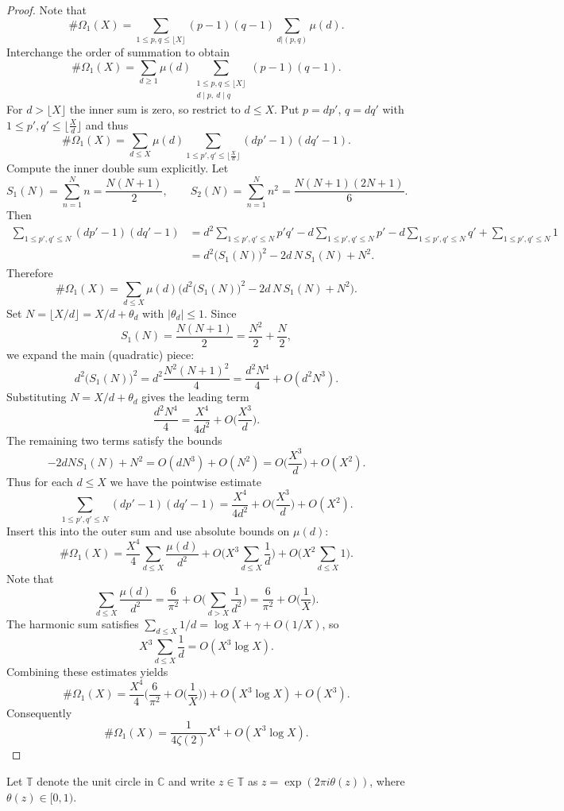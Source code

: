 \documentclass[table]{amsart}
\newcommand{\op}[1]{\operatorname{#1}}
\numberwithin{equation}{section}
\begin{document}
\begin{proof}
    Note that 
    \[\# \Omega_1(X)=\sum_{1\leq p, q\leq \lfloor X\rfloor } (p-1)(q-1)\sum_{d|(p,q)} \mu(d).\]
\noindent Interchange the order of summation to obtain
\[
\#\Omega_1(X)=\sum_{d\ge1}\mu(d)\sum_{\substack{1\le p,q\le\lfloor X\rfloor\\ d\mid p,\ d\mid q}} (p-1)(q-1).
\]
For \(d>\lfloor X\rfloor\) the inner sum is zero, so restrict to \(d\le X\). Put \(p=dp'\), \(q=dq'\) with \(1\le p',q'\le \lfloor\frac{X}{d}\rfloor\) and thus
\[
\#\Omega_1(X)=\sum_{d\le X}\mu(d)\sum_{1\le p',q'\le \lfloor\frac{X}{d}\rfloor} (dp'-1)(dq'-1).
\]
Compute the inner double sum explicitly. Let
\[
S_1(N)=\sum_{n=1}^N n=\frac{N(N+1)}{2},\qquad
S_2(N)=\sum_{n=1}^N n^2=\frac{N(N+1)(2N+1)}{6}.
\]
Then
\begin{align*}
\sum_{1\le p',q'\le N} (dp'-1)(dq'-1)
&= d^2\sum_{1\le p',q'\le N} p'q' - d\sum_{1\le p',q'\le N} p' - d\sum_{1 \le p',q'\le N} q' + \sum_{1\le p',q'\le N} 1 \\
&= d^2\big(S_1(N)\big)^2 - 2d\,N\,S_1(N) + N^2.
\end{align*}
\noindent Therefore
\[
\#\Omega_1(X)=\sum_{d\le X}\mu(d)\Big( d^2\big(S_1(N)\big)^2 - 2d\,N\,S_1(N) + N^2\Big).
\]
\noindent Set \(N=\lfloor X/d\rfloor = X/d + \theta_d\) with \(|\theta_d|\le1\). Since
\[
S_1(N)=\frac{N(N+1)}{2}=\frac{N^2}{2}+\frac{N}{2},
\]
we expand the main (quadratic) piece:
\[
d^2\big(S_1(N)\big)^2
= d^2\frac{N^2(N+1)^2}{4}
= \frac{d^2 N^4}{4} + O(d^2 N^3).
\]
Substituting \(N=X/d+\theta_d\) gives the leading term
\[
\frac{d^2 N^4}{4} = \frac{X^4}{4d^2} + O\!\Big(\frac{X^3}{d}\Big).\] The remaining two terms satisfy the bounds
\[
-2dN S_1(N) + N^2 = O(d N^3) + O(N^2) = O\!\Big(\frac{X^3}{d}\Big) + O(X^2).
\]
Thus for each \(d\le X\) we have the pointwise estimate
\[
\sum_{1\le p',q'\le N}(dp'-1)(dq'-1)
= \frac{X^4}{4d^2} + O\!\Big(\frac{X^3}{d}\Big) + O(X^2).
\]
\noindent Insert this into the outer sum and use absolute bounds on \(\mu(d)\):
\[
\#\Omega_1(X)
= \frac{X^4}{4}\sum_{d\le X}\frac{\mu(d)}{d^2}
+ O\!\Big(X^3\sum_{d\le X}\frac{1}{d}\Big)
+ O\!\Big(X^2\sum_{d\le X}1\Big).
\]
Note that
\[
\sum_{d\le X}\frac{\mu(d)}{d^2}=\frac{6}{\pi^2}+O\!\Big(\sum_{d>X}\frac{1}{d^2}\Big)
=\frac{6}{\pi^2}+O\!\Big(\frac{1}{X}\Big).
\]
\noindent The harmonic sum satisfies \(\sum_{d\le X}1/d= \log X + \gamma + O(1/X)\), so
\[
X^3\sum_{d\le X}\frac{1}{d}=O(X^3\log X).
\]
\noindent Combining these estimates yields
\[
\#\Omega_1(X)
= \frac{X^4}{4}\Big(\frac{6}{\pi^2}+O\!\Big(\frac{1}{X}\Big)\Big)
+ O(X^3\log X)
+ O(X^3).
\]
Consequently
\[
\#\Omega_1(X)=\frac{1}{4 \zeta(2)} X^4 + O(X^3\log X).
\]

\end{proof}
\par Let $\mathbb{T}$ denote the unit circle in $\mathbb{C}$ and write $z\in \mathbb{T}$ as $z=\op{exp}(2\pi i \theta(z))$, where $\theta(z)\in [0, 1)$.
\end{document}
